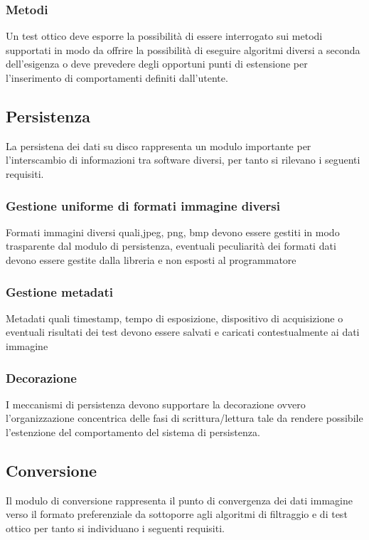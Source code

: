 \subsubsection{Metodi}
Un test ottico deve esporre la possibilità di essere interrogato sui metodi supportati in modo da offrire la possibilità di eseguire algoritmi diversi a seconda dell'esigenza o deve prevedere degli opportuni punti di estensione per l'inserimento di comportamenti definiti dall'utente.


\subsection{Persistenza}
La persistena dei dati su disco rappresenta un modulo importante per l'interscambio di informazioni tra software diversi, per tanto si rilevano i seguenti requisiti.

\subsubsection{Gestione uniforme di formati immagine diversi}
Formati immagini diversi quali,jpeg, png, bmp devono essere gestiti in modo trasparente dal modulo di persistenza, eventuali peculiarità dei formati dati devono essere gestite dalla libreria e non esposti al programmatore

\subsubsection{Gestione metadati}
Metadati quali timestamp, tempo di esposizione, dispositivo di acquisizione o eventuali risultati dei test devono essere salvati e caricati contestualmente ai dati immagine

\subsubsection{Decorazione}
I meccanismi di persistenza devono supportare la decorazione ovvero l'organizzazione concentrica delle fasi di scrittura/lettura tale da rendere possibile l'estenzione del comportamento del sistema di persistenza.

\subsection{Conversione}
Il modulo di conversione rappresenta il punto di convergenza dei dati immagine verso il formato preferenziale da sottoporre agli algoritmi di filtraggio e di test ottico per tanto si individuano i seguenti requisiti.

